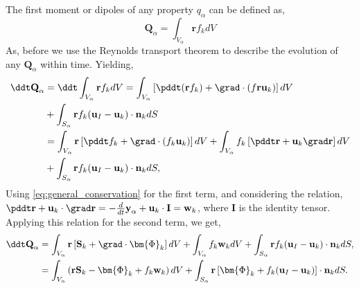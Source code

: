 The first moment or dipoles of any property $q_\alpha$ can be defined as,
\begin{equation*}
    \textbf{Q}_\alpha 
    = \int_{V_\alpha} \textbf{r} f_k dV
\end{equation*}
As, before we use the Reynolds transport theorem to describe the evolution of any $\textbf{Q}_\alpha$ within time. 
Yielding,
\begin{align}
    \ddt \textbf{Q}_\alpha
    & = \ddt \int_{V_\alpha} \textbf{r} f_k dV  
    =  \int_{V_\alpha} \left[
        \pddt(\textbf{r}  f_k)
        + \grad \cdot \left(f \textbf{r} \textbf{u}_k\right)
    \right]dV \nonumber \\
    &+ \int_{S_\alpha} \textbf{r}  f_k  (\textbf{u}_I-\textbf{u}_k)\cdot \textbf{n}_k  dS  \nonumber \\
    &=  \int_{V_\alpha} \textbf{r}\left[
        \pddt f_k
        + \grad \cdot \left(f_k \textbf{u}_k\right)
    \right] dV
    + \int_{V_\alpha} f_k \left[
        \pddt \textbf{r}
        +\textbf{u}_k \grad \textbf{r}
    \right]dV\\
    &+ \int_{S_\alpha} \textbf{r}  f_k (\textbf{u}_I-\textbf{u}_k)\cdot \textbf{n}_k  dS,
\end{align}
Using \ref{eq:general_conservation} for the first term, and considering the relation,
$  \pddt \textbf{r}
+ \textbf{u}_k \cdot \grad \textbf{r}
= - \frac{d}{dt} \textbf{y}_\alpha  + \textbf{u}_k \cdot \textbf{I}
= \textbf{w}_k$,
where $\textbf{I}$ is the identity tensor. 
Applying this relation for the second term, we get, 
\begin{align}
    \ddt \textbf{Q}_\alpha
    &= \int_{V_\alpha} \textbf{r} \left[
         \textbf{S}_k +  \grad \cdot \bm{\Phi}_k
    \right]dV
    +\int_{V_\alpha} f_k  \textbf{w}_k dV
    + \int_{S_\alpha} \textbf{r}  f_k (\textbf{u}_I-\textbf{u}_k)\cdot \textbf{n}_k  dS,\\
    &= \int_{V_\alpha} \left( 
        \textbf{r} \textbf{S}_k 
        - \bm{\Phi}_k
        + f_k  \textbf{w}_k 
    \right) dV
    + \int_{S_\alpha} \textbf{r} \left[
        \bm{\Phi}_k
        + f_k (\textbf{u}_I-\textbf{u}_k)
    \right]\cdot \textbf{n}_k  dS.
\end{align}
